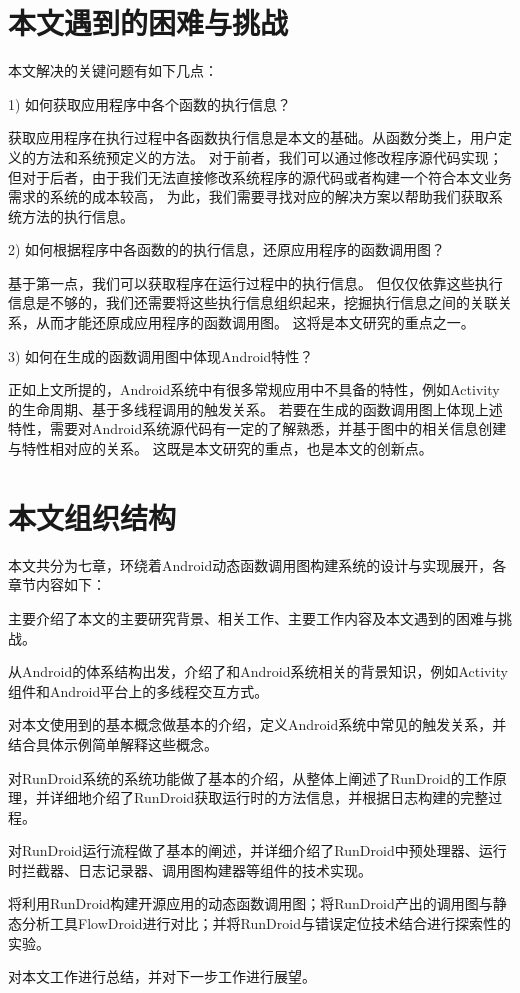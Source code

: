 \section{本文遇到的困难与挑战}


本文解决的关键问题有如下几点：

1)	如何获取应用程序中各个函数的执行信息？

获取应用程序在执行过程中各函数执行信息是本文的基础。从函数分类上，用户定义的方法和系统预定义的方法。
对于前者，我们可以通过修改程序源代码实现；但对于后者，由于我们无法直接修改系统程序的源代码或者构建一个符合本文业务需求的系统的成本较高，
为此，我们需要寻找对应的解决方案以帮助我们获取系统方法的执行信息。

2)	如何根据程序中各函数的的执行信息，还原应用程序的函数调用图？

基于第一点，我们可以获取程序在运行过程中的执行信息。
但仅仅依靠这些执行信息是不够的，我们还需要将这些执行信息组织起来，挖掘执行信息之间的关联关系，从而才能还原成应用程序的函数调用图。
这将是本文研究的重点之一。

3)	如何在生成的函数调用图中体现Android特性？

正如上文所提的，Android系统中有很多常规应用中不具备的特性，例如Activity的生命周期、基于多线程调用的触发关系。
若要在生成的函数调用图上体现上述特性，需要对Android系统源代码有一定的了解熟悉，并基于图中的相关信息创建与特性相对应的关系。
这既是本文研究的重点，也是本文的创新点。


\section{本文组织结构}


本文共分为七章，环绕着Android动态函数调用图构建系统的设计与实现展开，各章节内容如下：

主要介绍了本文的主要研究背景、相关工作、主要工作内容及本文遇到的困难与挑战。

从Android的体系结构出发，介绍了和Android系统相关的背景知识，例如Activity组件和Android平台上的多线程交互方式。

对本文使用到的基本概念做基本的介绍，定义Android系统中常见的触发关系，并结合具体示例简单解释这些概念。


对RunDroid系统的系统功能做了基本的介绍，从整体上阐述了RunDroid的工作原理，并详细地介绍了RunDroid获取运行时的方法信息，并根据日志构建\ecg 的完整过程。


对RunDroid运行流程做了基本的阐述，并详细介绍了RunDroid中预处理器、运行时拦截器、日志记录器、调用图构建器等组件的技术实现。

 将利用RunDroid构建开源应用的动态函数调用图；将RunDroid产出的调用图与静态分析工具FlowDroid进行对比；并将RunDroid与错误定位技术结合进行探索性的实验。

对本文工作进行总结，并对下一步工作进行展望。


